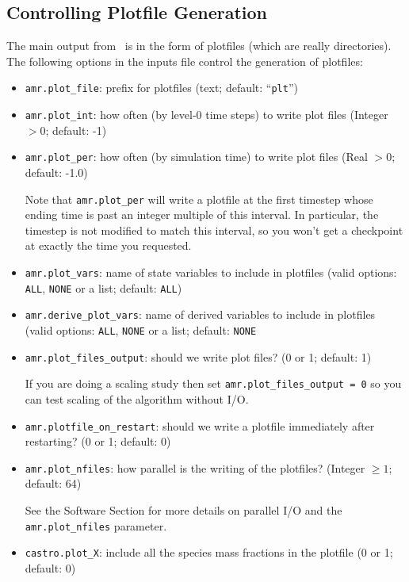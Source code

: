 \subsection{Controlling Plotfile Generation}
\label{sec:PlotFiles}
The main output from \castro\ is in the form of plotfiles (which are
really directories).  The following options in the inputs file control
the generation of plotfiles:
\begin{itemize}
\item {\tt amr.plot\_file}: prefix for plotfiles (text; default:
  ``{\tt plt}'')

\item {\tt amr.plot\_int}: how often (by level-0 time steps) to write
  plot files (Integer $> 0$; default: -1)

\item {\tt amr.plot\_per}: how often (by simulation time) to write
  plot files (Real $> 0$; default: -1.0)

  Note that {\tt amr.plot\_per} will write a plotfile at the first
  timestep whose ending time is past an integer multiple of this interval.
  In particular, the timestep is not modified to match this interval, so
  you won't get a checkpoint at exactly the time you requested.

\item {\tt amr.plot\_vars}: name of state variables to include in
  plotfiles (valid options: {\tt ALL}, {\tt NONE} or a list; default:
  {\tt ALL})

\item {\tt amr.derive\_plot\_vars}: name of derived variables to
  include in plotfiles (valid options: {\tt ALL}, {\tt NONE} or a
  list; default: {\tt NONE}

\item {\tt amr.plot\_files\_output}: should we write plot files? (0 or
  1; default: 1)

If you are doing a scaling study then set {\tt amr.plot\_files\_output
  = 0} so you can test scaling of the algorithm without I/O.

\item {\tt amr.plotfile\_on\_restart}: should we write a plotfile
  immediately after restarting?  (0 or 1; default: 0)
  
\item {\tt amr.plot\_nfiles}: how parallel is the writing of the
  plotfiles?  (Integer $\geq 1$; default: 64)

See the Software Section for more details on parallel I/O and the {\tt
  amr.plot\_nfiles} parameter.

\item {\tt castro.plot\_X}: include all the species mass fractions in
  the plotfile (0 or 1; default: 0)

\end{itemize}


